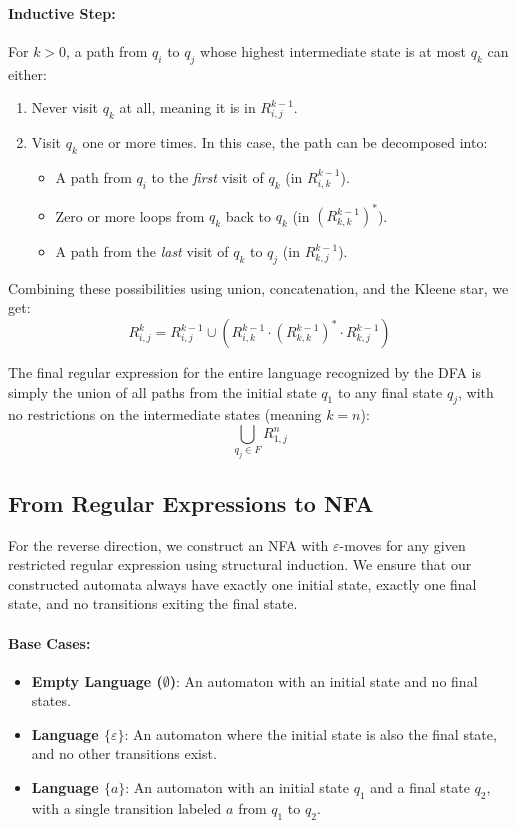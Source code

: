 \paragraph{Inductive Step:} For $k > 0$, a path from $q_i$ to $q_j$ whose highest intermediate state is at most $q_k$ can either:
\begin{enumerate}
    \item Never visit $q_k$ at all, meaning it is in $R_{i,j}^{k-1}$.
    \item Visit $q_k$ one or more times. In this case, the path can be decomposed into:
    \begin{itemize}
        \item A path from $q_i$ to the \emph{first} visit of $q_k$ (in $R_{i,k}^{k-1}$).
        \item Zero or more loops from $q_k$ back to $q_k$ (in $(R_{k,k}^{k-1})^*$).
        \item A path from the \emph{last} visit of $q_k$ to $q_j$ (in $R_{k,j}^{k-1}$).
    \end{itemize}
\end{enumerate}

Combining these possibilities using union, concatenation, and the Kleene star, we get:
\[
R_{i,j}^k = R_{i,j}^{k-1} \cup \left( R_{i,k}^{k-1} \cdot (R_{k,k}^{k-1})^* \cdot R_{k,j}^{k-1} \right)
\]

The final regular expression for the entire language recognized by the DFA is simply the union of all paths from the initial state $q_1$ to any final state $q_j$, with no restrictions on the intermediate states (meaning $k = n$):
\[
\bigcup_{q_j \in F} R_{1,j}^n
\]

\subsection{From Regular Expressions to NFA}

For the reverse direction, we construct an NFA with $\varepsilon$-moves for any given restricted regular expression using structural induction. We ensure that our constructed automata always have exactly one initial state, exactly one final state, and no transitions exiting the final state.

\paragraph{Base Cases:}
\begin{itemize}
    \item \textbf{Empty Language ($\emptyset$)}: An automaton with an initial state and no final states.
    \item \textbf{Language $\{\varepsilon\}$}: An automaton where the initial state is also the final state, and no other transitions exist.
    \item \textbf{Language $\{a\}$}: An automaton with an initial state $q_1$ and a final state $q_2$, with a single transition labeled $a$ from $q_1$ to $q_2$.
\end{itemize}

